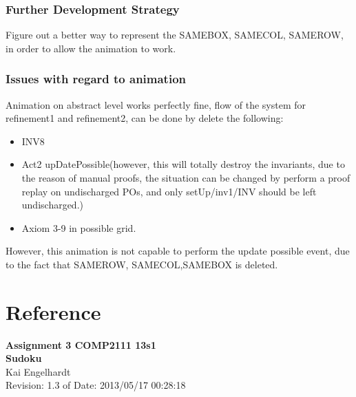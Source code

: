 \documentclass[a4paper]{article}
\begin{document}
\subsubsection{Further Development Strategy}
\indent\indent Figure out a better way to represent the SAMEBOX, SAMECOL, SAMEROW, in order to allow the animation to work.

\subsubsection{Issues with regard to animation}
Animation on abstract level works perfectly fine, flow of the system for refinement1 and refinement2, can be done by delete the following:
\begin{itemize}
\item INV8
\item Act2 upDatePossible(however, this will totally destroy the invariants, due to the reason of manual proofs, the situation can be changed by perform a proof replay on undischarged POs, and only setUp/inv1/INV should be left undischarged.)
\item Axiom 3-9 in possible grid.
\end{itemize}
However, this animation is not capable to perform the update possible event, due to the fact that SAMEROW, SAMECOL,SAMEBOX is deleted.
\newpage
\appendix
\section{Reference}
\begin{center}
\textbf{Assignment 3 COMP2111 13s1\\
Sudoku\\}
Kai Engelhardt\\
Revision: 1.3 of Date: 2013/05/17 00:28:18
\end{center}
\end{document}
